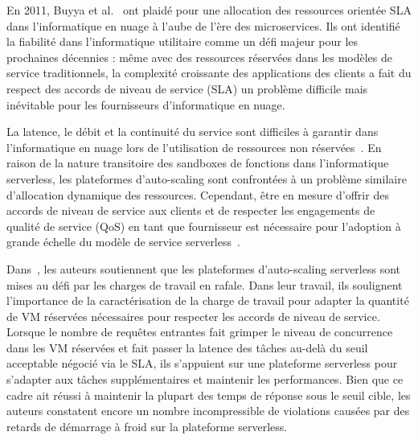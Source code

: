 En 2011, Buyya et al.~\cite{buyyaSLAorientedResourceProvisioning2011} ont plaidé pour une allocation des ressources orientée SLA dans l'informatique en nuage à l'aube de l'ère des microservices. Ils ont identifié la fiabilité dans l'informatique utilitaire comme un défi majeur pour les prochaines décennies : même avec des ressources réservées dans les modèles de service traditionnels, la complexité croissante des applications des clients a fait du respect des accords de niveau de service (SLA) un problème difficile mais inévitable pour les fournisseurs d'informatique en nuage.

La latence, le débit et la continuité du service sont difficiles à garantir dans l'informatique en nuage lors de l'utilisation de ressources non réservées~\cite{dartoisCuckooOpportunisticMapReduce2019}. En raison de la nature transitoire des sandboxes de fonctions dans l'informatique serverless, les plateformes d'auto-scaling sont confrontées à un problème similaire d'allocation dynamique des ressources. Cependant, être en mesure d'offrir des accords de niveau de service aux clients et de respecter les engagements de qualité de service (QoS) en tant que fournisseur est nécessaire pour l'adoption à grande échelle du modèle de service serverless~\cite{elsakhawyFaaS2FFrameworkDefining2020}.

Dans~\cite{chahalSLAawareWorkloadScheduling2020}, les auteurs soutiennent que les plateformes d'auto-scaling serverless sont mises au défi par les charges de travail en rafale. Dans leur travail, ils soulignent l'importance de la caractérisation de la charge de travail pour adapter la quantité de VM réservées nécessaires pour respecter les accords de niveau de service. Lorsque le nombre de requêtes entrantes fait grimper le niveau de concurrence dans les VM réservées et fait passer la latence des tâches au-delà du seuil acceptable négocié via le SLA, ils s'appuient sur une plateforme serverless pour s'adapter aux tâches supplémentaires et maintenir les performances. Bien que ce cadre ait réussi à maintenir la plupart des temps de réponse sous le seuil cible, les auteurs constatent encore un nombre incompressible de violations causées par des retards de démarrage à froid sur la plateforme serverless.

